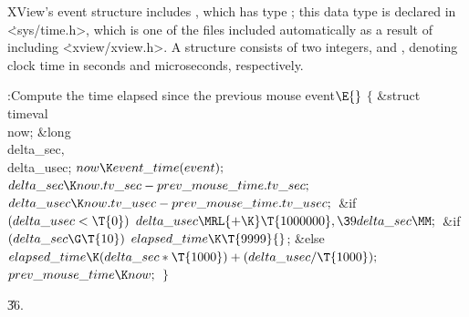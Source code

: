 XView's event structure includes , which
has
type ; this data type is declared in %
\.{<sys/time.h>},
which is one of the files included automatically as a result of
including \.{<xview/xview.h>}.
A  structure consists of two  integers,  and ,
denoting clock time in seconds and microseconds, respectively.

\Y\B\4:Compute the time elapsed since the previous mouse event\X${}\E{}$\6
${}\{{}$\5
\1\&{struct} \\{timeval} \\{now};\6
\&{long} \\{delta\_sec}${},{}$ \\{delta\_usec};\7
${}\\{now}\K\\{event\_time}(\\{event});{}$\6
${}\\{delta\_sec}\K\\{now}.\\{tv\_sec}-\\{prev\_mouse\_time}.\\{tv\_sec};{}$\6
${}\\{delta\_usec}\K\\{now}.\\{tv\_usec}-\\{prev\_mouse\_time}.\\{tv\_usec};{}$%
\6
\&{if} ${}(\\{delta\_usec}<\T{0}){}$\1\5
${}\\{delta\_usec}\MRL{+{\K}}\T{1000000},\39\\{delta\_sec}\MM;{}$\2\6
\&{if} ${}(\\{delta\_sec}\G\T{10}){}$\1\5
${}\\{elapsed\_time}\K\T{9999}{}$;\2\6
\&{else}\1\5
${}\\{elapsed\_time}\K(\\{delta\_sec}*\T{1000})+(\\{delta\_usec}/\T{1000});{}$%
\2\6
${}\\{prev\_mouse\_time}\K\\{now};{}$\6
\4${}\}{}$\2\par
\U36.\fi

